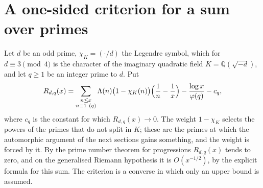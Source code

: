 \documentclass[10pt]{amsart}
\theoremstyle{definition}
\theoremstyle{remark}
\newcommand{\Q}{\mathbb Q}
\begin{document}
\section{A one-sided criterion for a sum over primes}\label{sec:criterion}
Let $d$ be an odd prime, $\chi_K=(\cdot/d)$ the Legendre symbol, which for $d\equiv3\pmod4$ is
the character of the imaginary quadratic field $K=\Q(\sqrt{-d})$, and let $q\ge1$ be an integer
prime to $d$. Put
\begin{equation}\label{eq:R}
 R_{d,q}(x)=\sum_{\substack{n\le x\\ n\equiv1\ (q)}}\Lambda(n)\bigl(1-\chi_K(n)\bigr)\Bigl(\frac1n-\frac1x\Bigr)-\frac{\log x}{\varphi(q)}-c_q ,
\end{equation}
where $c_q$ is the constant for which $R_{d,q}(x)\to0$. The weight $1-\chi_K$ selects the powers
of the primes that do not split in $K$; these are the primes at which the automorphic argument
of the next sections gains something, and the weight is forced by it. By the prime number
theorem for progressions $R_{d,q}(x)$ tends to zero, and on the generalised Riemann hypothesis
it is $O(x^{-1/2})$, by the explicit formula for this sum. The criterion is a converse in which
only an upper bound is assumed.
\end{document}
